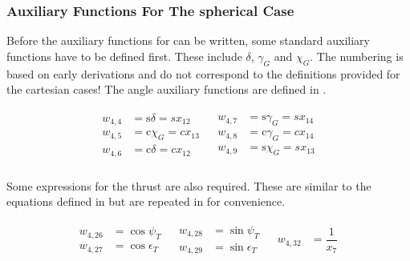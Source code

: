 \subsubsection{Auxiliary Functions For The spherical Case}
\label{subsubsec:auxFspher}
Before the auxiliary functions for  can be written, some standard auxiliary functions have to be defined first. These include $\delta$, $\gamma_{G}$ and $\chi_{G}$. The numbering is based on early derivations and do not correspond to the definitions provided for the cartesian cases! The angle auxiliary functions are defined in .

\begin{align} \label{eq:SpherAnglF}
\begin{split}
w_{4,4} &= \text{s}\delta = s x_{12}  \\
w_{4,5} &= \text{c}\chi_{G} = c x_{13} \\
w_{4,6} &= \text{c}\delta = c x_{12} \\
\end{split}
&
\begin{split}
w_{4,7} &= \text{s}\gamma_{G} = s x_{14} \\
w_{4,8} &= \text{c}\gamma_{G} = c x_{14} \\
w_{4,9} &= \text{s}\chi_{G} = s x_{13} \\
\end{split}
\end{align}

\noindent
Some expressions for the thrust are also required. These are similar to the equations defined in  but are repeated in  for convenience. 

\begin{align} \label{eq:thrustAuxF}
\begin{split}
w_{4,26} &= \cos \psi_{T} \\
w_{4,27} &= \cos \epsilon_{T} \\
\end{split}
&
\begin{split}
w_{4,28} &= \sin \psi_{T} \\
w_{4,29} &= \sin \epsilon_{T} \\
\end{split}
&
\begin{split}
w_{4,32} &= \dfrac{1}{x_{7}} \\
\end{split}
\end{align}


